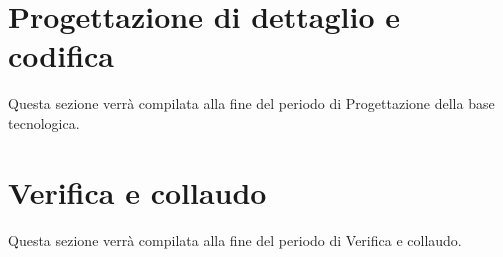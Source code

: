 \newpage
\section{Progettazione di dettaglio e codifica}
Questa sezione verrà compilata alla fine del periodo di Progettazione della base tecnologica.
\section{Verifica e collaudo}
Questa sezione verrà compilata alla fine del periodo di Verifica e collaudo.